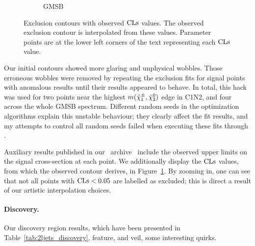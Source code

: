 \begin{figure}[tp]
\begin{subfigure}{0.7\textwidth}
\caption{GMSB}
\end{subfigure}
\caption[
Exclusion contours with observed $\cls$ values
]{%
Exclusion contours with observed $\cls$ values.
The observed exclusion contour is interpolated from these values.
Parameter points are at the lower left corners of the text representing each
$\cls$ value.
}
\label{fig:2ljets_fit_contours_cls}
\end{figure}

Our initial contours showed more glaring and unphysical wobbles.
Those erroneous wobbles were removed by repeating the exclusion fits for signal
points with anomalous results until their results appeared to behave.
In total, this hack was used for two points near the highest
$m(\tilde\chi^\pm_1,\tilde\chi^0_2)$ edge in C1N2, and four across the whole
GMSB spectrum.
Different random seeds in the optimization algorithms explain this unstable
behaviour; they clearly affect the fit results, and my attempts to control all
random seeds failed when executing these fits through \histfitter.

Auxiliary results published in our \hepdata\ archive~\cite{hepdata.116034}
include the observed upper limits on the signal cross-section at each point.
We additionally display the $\cls$ values, from which the observed contour
derives, in Figure~\ref{fig:2ljets_fit_contours_cls}.
By zooming in, one can see that not all points with $\mathrm{CLs} < 0.05$ are
labelled as excluded;
this is direct a result of our artistic interpolation choices.


\paragraph{Discovery.}
Our discovery region results,
which have been presented in Table~\ref{tab:2ljets_discovery},
feature, and veil, some interesting quirks.

